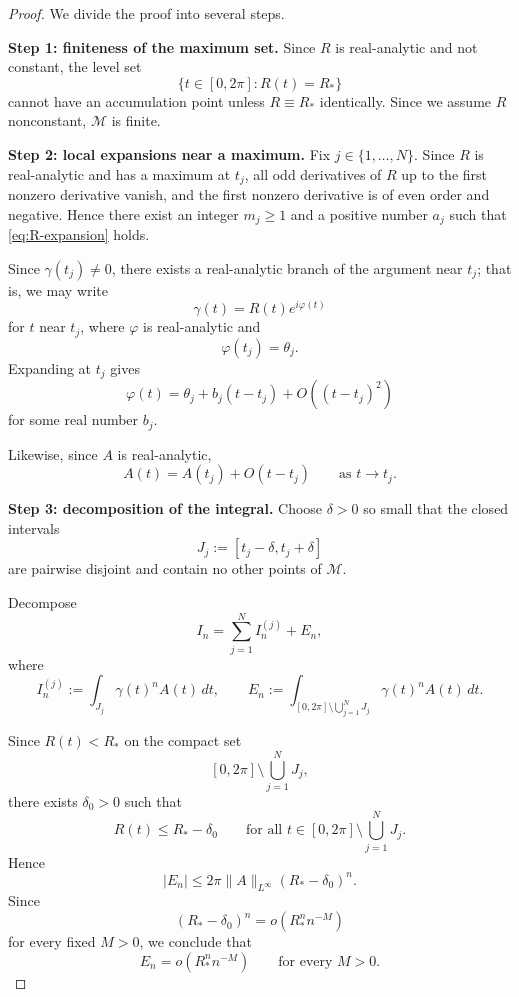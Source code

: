 \documentclass[11pt]{amsart}
\theoremstyle{remark}
\newcommand{\1}{\mathbf 1}
\begin{document}
\begin{proof}
We divide the proof into several steps.

\medskip

\noindent\textbf{Step 1: finiteness of the maximum set.}
Since $R$ is real-analytic and not constant, the level set
\[
\{t\in[0,2\pi]:R(t)=R_*\}
\]
cannot have an accumulation point unless $R\equiv R_*$ identically. Since we assume $R$ nonconstant, $\mathcal M$ is finite.

\medskip

\noindent\textbf{Step 2: local expansions near a maximum.}
Fix $j\in\{1,\dots,N\}$. Since $R$ is real-analytic and has a maximum at $t_j$, all odd derivatives of $R$ up to the first nonzero derivative vanish, and the first nonzero derivative is of even order and negative. Hence there exist an integer $m_j\ge 1$ and a positive number $a_j$ such that \eqref{eq:R-expansion} holds.

Since $\gamma(t_j)\neq 0$, there exists a real-analytic branch of the argument near $t_j$; that is, we may write
\[
\gamma(t)=R(t)e^{i\varphi(t)}
\]
for $t$ near $t_j$, where $\varphi$ is real-analytic and
\[
\varphi(t_j)=\theta_j.
\]
Expanding at $t_j$ gives
\[
\varphi(t)=\theta_j+b_j(t-t_j)+O((t-t_j)^2)
\]
for some real number $b_j$.

Likewise, since $A$ is real-analytic,
\[
A(t)=A(t_j)+O(t-t_j)
\qquad\text{as }t\to t_j.
\]

\medskip

\noindent\textbf{Step 3: decomposition of the integral.}
Choose $\delta>0$ so small that the closed intervals
\[
J_j:=[t_j-\delta,t_j+\delta]
\]
are pairwise disjoint and contain no other points of $\mathcal M$.

Decompose
\[
I_n=\sum_{j=1}^N I_n^{(j)}+E_n,
\]
where
\[
I_n^{(j)}:=\int_{J_j}\gamma(t)^nA(t)\,dt,
\qquad
E_n:=\int_{[0,2\pi]\setminus \bigcup_{j=1}^N J_j}\gamma(t)^nA(t)\,dt.
\]

Since $R(t)<R_*$ on the compact set
\[
[0,2\pi]\setminus \bigcup_{j=1}^N J_j,
\]
there exists $\delta_0>0$ such that
\[
R(t)\le R_*-\delta_0
\qquad\text{for all }t\in [0,2\pi]\setminus \bigcup_{j=1}^N J_j.
\]
Hence
\[
|E_n|
\le
2\pi \|A\|_{L^\infty}(R_*-\delta_0)^n.
\]
Since
\[
(R_*-\delta_0)^n=o(R_*^n n^{-M})
\]
for every fixed $M>0$, we conclude that
\begin{equation}\label{eq:E-small}
E_n=o(R_*^n n^{-M})
\qquad\text{for every }M>0.
\end{equation}

\medskip


\end{proof}
\end{document}
